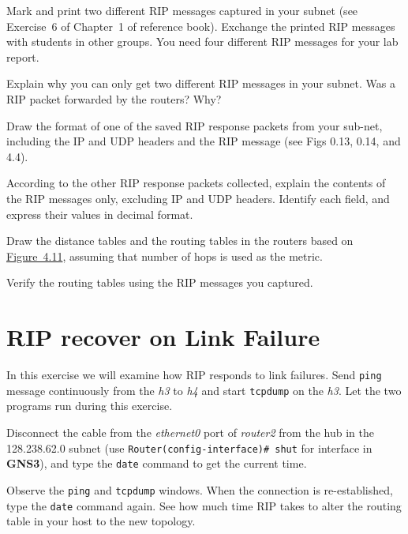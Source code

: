 \documentclass{../UTNetLab}
\begin{document}
    Mark and print two different RIP messages captured in your subnet (see Exercise~6 of Chapter~1 of reference book).
    Exchange the printed RIP messages with students in other groups.
    You need four different RIP messages for your lab report.
    
    \begin{report}
        \item Explain why you can only get two different RIP messages in your subnet.
        Was a RIP packet forwarded by the routers?
        Why?
        
        \item Draw the format of one of the saved RIP response packets from your sub-net, including the IP and UDP headers and the RIP message (see Figs 0.13, 0.14, and 4.4).
        
        \item According to the other RIP response packets collected, explain the contents of the RIP messages only, excluding IP and UDP headers.
        Identify each field, and express their values in decimal format.

        
        \item Draw the distance tables and the routing tables in the routers based on \hyperref[fig:4.11]{Figure~4.11}, assuming that number of hops is used as the metric.

        \item Verify the routing tables using the RIP messages you captured.
    \end{report}


\section{RIP recover on Link Failure}
    In this exercise we will examine how RIP responds to link failures.
    Send \lstinline{ping} message continuously from the \textit{h3} to \textit{h4} and start \lstinline{tcpdump} on the \textit{h3}.
    Let the two programs run during this exercise.

    Disconnect the cable from the \textit{ethernet0} port of \textit{router2} from the hub in the 128.238.62.0 subnet (use \lstinline[language={cisco}]{Router(config-interface)# shut} for interface in \textbf{GNS3}), and type the \lstinline{date} command to get the current time.

    Observe the \lstinline{ping} and \lstinline{tcpdump} windows.
    When the connection is re-established, type the \lstinline{date} command again.
    See how much time RIP takes to alter the routing table in your host to the new topology.
\end{document}
